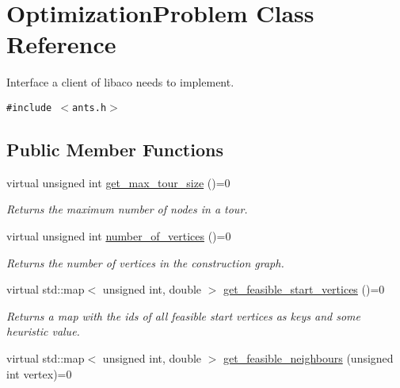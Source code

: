 \hypertarget{classOptimizationProblem}{
\section{OptimizationProblem Class Reference}
\label{classOptimizationProblem}
}
Interface a client of libaco needs to implement.  


{\tt \#include $<$ants.h$>$}

\subsection*{Public Member Functions}
\begin{CompactItemize}
\item 
\hypertarget{classOptimizationProblem_c415a4d1350cd3580f2fcf26f7f6196c}{
virtual unsigned int \hyperlink{classOptimizationProblem_c415a4d1350cd3580f2fcf26f7f6196c}{get\_\-max\_\-tour\_\-size} ()=0}
\label{classOptimizationProblem_c415a4d1350cd3580f2fcf26f7f6196c}

\begin{CompactList}\small\item\em Returns the maximum number of nodes in a tour. \item\end{CompactList}\item 
\hypertarget{classOptimizationProblem_3f2b6672193e9b543f9a3419b6a516e8}{
virtual unsigned int \hyperlink{classOptimizationProblem_3f2b6672193e9b543f9a3419b6a516e8}{number\_\-of\_\-vertices} ()=0}
\label{classOptimizationProblem_3f2b6672193e9b543f9a3419b6a516e8}

\begin{CompactList}\small\item\em Returns the number of vertices in the construction graph. \item\end{CompactList}\item 
\hypertarget{classOptimizationProblem_9d90c97f690e8987a152b37d0c51e744}{
virtual std::map$<$ unsigned int, double $>$ \hyperlink{classOptimizationProblem_9d90c97f690e8987a152b37d0c51e744}{get\_\-feasible\_\-start\_\-vertices} ()=0}
\label{classOptimizationProblem_9d90c97f690e8987a152b37d0c51e744}

\begin{CompactList}\small\item\em Returns a map with the ids of all feasible start vertices as keys and some heuristic value. \item\end{CompactList}\item 
\hypertarget{classOptimizationProblem_582a4ef61a491e2741060c2f83c3fc2e}{
virtual std::map$<$ unsigned int, double $>$ \hyperlink{classOptimizationProblem_582a4ef61a491e2741060c2f83c3fc2e}{get\_\-feasible\_\-neighbours} (unsigned int vertex)=0}
\label{classOptimizationProblem_582a4ef61a491e2741060c2f83c3fc2e}


\end{CompactItemize}
